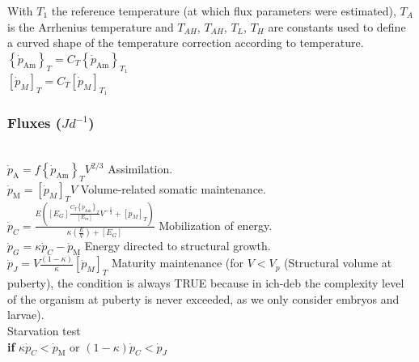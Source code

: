 With $T_{1}$ the reference temperature (at which flux parameters were estimated), $T_{A}$ is the Arrhenius temperature and $T_{AH}$, $T_{AH}$, $T_{L}$, $T_{H}$ are constants used to define a curved shape of the temperature correction according to temperature.\\

$\left \{ \dot{p}_\mathrm{Am} \right \}_{T} = C_{T} \left \{ \dot{p}_\mathrm{Am} \right \}_{T_{1}}$\\

$\left [ \dot{p}_{M} \right ]_{T} = C_{T} \left [ \dot{p}_{M} \right ]_{T_{1}}$\\

\subsubsection{Fluxes ($Jd^{-1}$)}\label{Chap3Fluxex}
\hfill \\

$\dot{p}_\mathrm{A} = f \left \{ \dot{p}_\mathrm{Am} \right \}_{T} V^{2/3}$ \hfill Assimilation.\\

$\dot{p}_\mathrm{M} = \left [ \dot{p}_{M} \right ]_{T} V$ \hfill Volume-related somatic maintenance.\\


	$\dot{p}_{C} = \frac
					   {E\left ( \left [ E_{G} \right ] \frac{C_{T}\left \{ \dot{p}_\mathrm{Am} \right \}_{T}}{\left [ E_{m} \right ]} V^{-\frac{1}{3}}+\left [ \dot{p}_{M} \right ]_{T}\right )}
					   {\kappa\left ( \frac{E}{V} \right ) + \left [ E_{G} \right ]}$ \hfill Mobilization of energy.\\

$\dot{p}_{G} = \kappa \dot{p}_{C} - \dot{p}_\mathrm{M}$ \hfill Energy directed to structural growth.\\

$\dot{p}_{J} = V \frac{\left ( 1 - \kappa \right )}{\kappa}\left [ \dot{p}_{M} \right ]_{T}$ \hfill Maturity maintenance (for $V < V_{p}$ (Structural volume at puberty), the condition is always TRUE because in \gls{ich-deb} the complexity level of the organism at puberty is never exceeded, as we only consider embryos and larvae).\\

Starvation test\\

\textbf{if} $\kappa \dot{p}_{C} < \dot{p}_\mathrm{M}$ or $\left ( 1- \kappa \right ) \dot{p}_{C} < \dot{p}_{J}$\\

